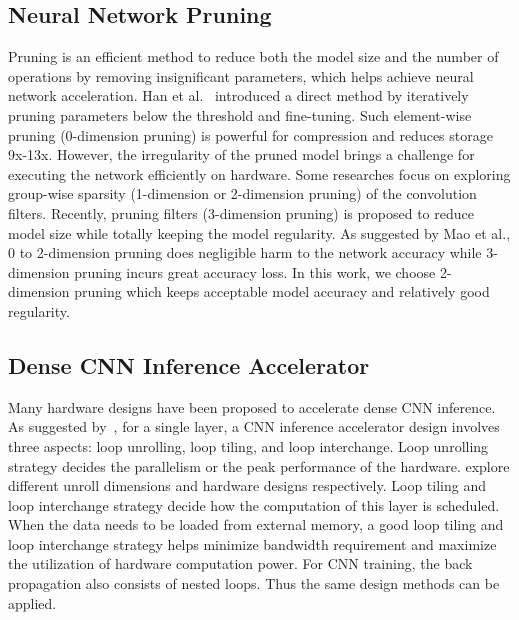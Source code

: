 \subsection{Neural Network Pruning}
Pruning is an efficient method to reduce both the model size and the number of operations by removing insignificant parameters, which helps achieve neural network acceleration. Han et al.~\cite{han2015learning} introduced a direct method by iteratively pruning parameters below the threshold and fine-tuning. Such element-wise pruning (0-dimension pruning) is powerful for compression and reduces storage 9x-13x. However, the irregularity of the pruned model brings a challenge for executing the network efficiently on hardware. Some researches focus on exploring group-wise sparsity (1-dimension or 2-dimension pruning)\cite{lebedev2016fast,zhou2016less,wen2016learning} of the convolution filters. Recently, pruning filters (3-dimension pruning)\cite{molchanov2016pruning,li2016pruning} is proposed to reduce model size while totally keeping the model regularity. As suggested by Mao et al.\cite{mao2017exploring}, 0 to 2-dimension pruning does negligible harm to the network accuracy while 3-dimension pruning incurs great accuracy loss. In this work, we choose 2-dimension pruning which keeps acceptable model accuracy and relatively good regularity.

\subsection{Dense CNN Inference Accelerator}\label{sec:rw_dense}
Many hardware designs have been proposed to accelerate dense CNN inference. As suggested by~\cite{ma2017optimizing}, for a single layer, a CNN inference accelerator design involves three aspects: loop unrolling, loop tiling, and loop interchange. Loop unrolling strategy decides the parallelism or the peak performance of the hardware. \cite{zhang2015optimizing, du2015shidiannao, qiu2016going} explore different unroll dimensions and hardware designs respectively. Loop tiling and loop interchange strategy decide how the computation of this layer is scheduled. When the data needs to be loaded from external memory, a good loop tiling and loop interchange strategy helps minimize bandwidth requirement and maximize the utilization of hardware computation power. For CNN training, the back propagation also consists of nested loops. Thus the same design methods can be applied.


